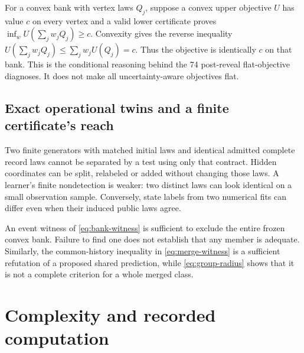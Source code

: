 For a convex bank with vertex laws $Q_j$, suppose a convex upper objective $U$ has value $c$ on every vertex and a valid lower certificate proves $\inf_wU(\sum_jw_jQ_j)\geq c$. Convexity gives the reverse inequality $U(\sum_jw_jQ_j)\leq\sum_jw_jU(Q_j)=c$. Thus the objective is identically $c$ on that bank. This is the conditional reasoning behind the 74 post-reveal flat-objective diagnoses. It does not make all uncertainty-aware objectives flat.

\subsection{Exact operational twins and a finite certificate's reach}
Two finite generators with matched initial laws and identical admitted complete record laws cannot be separated by a test using only that contract. Hidden coordinates can be split, relabeled or added without changing those laws. A learner's finite nondetection is weaker: two distinct laws can look identical on a small observation sample. Conversely, state labels from two numerical fits can differ even when their induced public laws agree.

An event witness of \cref{eq:bank-witness} is sufficient to exclude the entire frozen convex bank. Failure to find one does not establish that any member is adequate. Similarly, the common-history inequality in \cref{eq:merge-witness} is a sufficient refutation of a proposed shared prediction, while \cref{eq:group-radius} shows that it is not a complete criterion for a whole merged class.



\section{Complexity and recorded computation}\label{app:cost}

